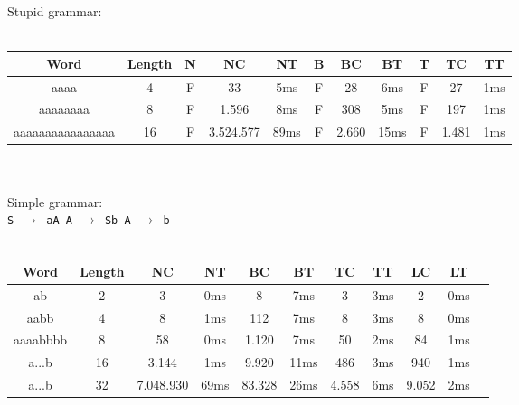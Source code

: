 \documentclass[a4paper, 11pt]{article}
\begin{document}
Stupid grammar: \\
\\
\begin{tabular}{|c|c||c|c|c||c|c|c||c|c|c|}
\hline
Word & Length & N & NC & NT & B & BC & BT & T & TC & TT \\
\hline
\hline
aaaa & 4 & F & 33 & 5ms & F & 28 & 6ms & F &27 & 1ms \\
\hline
aaaaaaaa & 8 & F & 1.596 & 8ms & F & 308 & 5ms & F & 197 & 1ms \\
\hline
aaaaaaaaaaaaaaaa & 16 & F & 3.524.577 & 89ms & F & 2.660 & 15ms & F & 1.481 & 1ms \\
\hline
\end{tabular}
\ \\
\\
Simple grammar:\\
\texttt{S $\rightarrow$ aA  \hspace*{1em} A $\rightarrow$ Sb \hspace*{1em} A $\rightarrow$ b} \ \\
\\
\begin{small}
\begin{tabular}{|c|c||c|c||c|c||c|c||c|c|c|}
\hline
Word & Length & NC & NT & BC & BT & TC & TT & LC & LT \\
\hline
\hline
ab & 2 & 3 & 0ms  & 8 & 7ms & 3 & 3ms & 2 & 0ms \\
\hline
aabb & 4 & 8 & 1ms & 112 & 7ms & 8 & 3ms & 8 & 0ms \\ 
\hline
aaaabbbb & 8 & 58 & 0ms & 1.120 & 7ms & 50 & 2ms & 84 & 1ms \\
\hline
a...b & 16 & 3.144 & 1ms & 9.920 & 11ms & 486 & 3ms & 940 & 1ms \\
\hline
a...b & 32 & 7.048.930 & 69ms & 83.328 & 26ms & 4.558 & 6ms & 9.052 & 2ms \\
\hline
\end{tabular}
\end{small}
\end{document}
